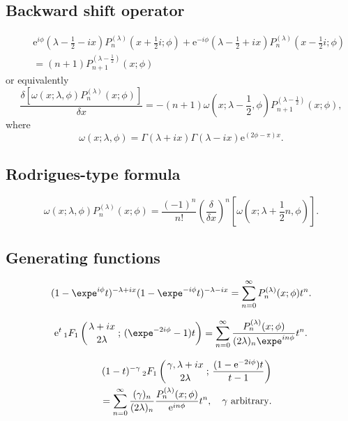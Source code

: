 \documentclass[envcountchap,graybox]{svmono}
\newcommand{\hyp}[5]{\mbox{}_{#1}{F}_{#2}
\left(\genfrac{}{}{0pt}{}{#3}{#4}\,;\,#5\right)}
\newcommand{\e}{\textrm{e}}
\renewcommand{\Gamma}{\varGamma}
\begin{document}
\subsection*{Backward shift operator}
\begin{eqnarray}
\label{shift2MPI}
& &\e^{i\phi}(\lambda-\textstyle\frac{1}{2}-ix)
P_n^{(\lambda)}(x+\textstyle\frac{1}{2}i;\phi)+
\e^{-i\phi}(\lambda-\textstyle\frac{1}{2}+ix)
P_n^{(\lambda)}(x-\textstyle\frac{1}{2}i;\phi)\nonumber\\
& &{}=(n+1)P_{n+1}^{(\lambda-\frac{1}{2})}(x;\phi)
\end{eqnarray}
or equivalently
\begin{equation}
\label{shift2MPII}
\frac{\delta\left[\omega(x;\lambda,\phi)P_n^{(\lambda)}(x;\phi)\right]}{\delta x}=
-(n+1)\omega(x;\lambda-\textstyle\frac{1}{2},\phi)
P_{n+1}^{(\lambda-\frac{1}{2})}(x;\phi),
\end{equation}
where
$$\omega(x;\lambda,\phi)=\Gamma(\lambda+ix)\Gamma(\lambda-ix)\e^{(2\phi-\pi)x}.$$

\subsection*{Rodrigues-type formula}
\begin{equation}
\label{RodMP}
\omega(x;\lambda,\phi)P_n^{(\lambda)}(x;\phi)=\frac{(-1)^n}{n!}
\left(\frac{\delta}{\delta x}\right)^n\left[\omega(x;\lambda+\textstyle\frac{1}{2}n,\phi)\right].
\end{equation}

\newpage

\subsection*{Generating functions}
\begin{equation}
\label{GenMP1}
(1-\expe^{i\phi}t)^{-\lambda+ix}(1-\expe^{-i\phi}t)^{-\lambda-ix}=
\sum_{n=0}^{\infty}P_n^{(\lambda)}(x;\phi)t^n.
\end{equation}

\begin{equation}
\label{GenMP2}
\e^t\,\hyp{1}{1}{\lambda+ix}{2\lambda}{(\expe^{-2i\phi}-1)t}=
\sum_{n=0}^{\infty}\frac{P_n^{(\lambda)}(x;\phi)}{(2\lambda)_n\expe^{in\phi}}t^n.
\end{equation}

\begin{eqnarray}
\label{GenMP3}
& &(1-t)^{-\gamma}\,\hyp{2}{1}{\gamma,\lambda+ix}{2\lambda}{\frac{(1-\e^{-2i\phi})t}{t-1}}\nonumber\\
& &{}=\sum_{n=0}^{\infty}\frac{(\gamma)_n}{(2\lambda)_n}\frac{P_n^{(\lambda)}(x;\phi)}{\e^{in\phi}}t^n,
\quad\textrm{$\gamma$ arbitrary}.
\end{eqnarray}
\end{document}
